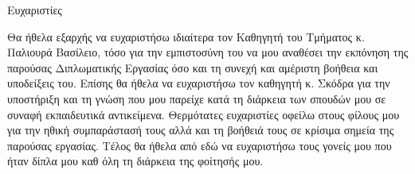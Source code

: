 \begin{center}
{\LARGE Ευχαριστίες}\\[1cm]
\end{center}

\noindent Θα ήθελα εξαρχής να ευχαριστήσω ιδιαίτερα τον Καθηγητή του Τμήματος κ. Παλιουρά Βασίλειο, τόσο για την εμπιστοσύνη του να μου αναθέσει την εκπόνηση της παρούσας Διπλωματικής Εργασίας όσο και τη συνεχή και αμέριστη βοήθεια και υποδείξεις του. Επίσης θα ήθελα να ευχαριστήσω τον καθηγητή κ. Σκόδρα για την υποστήριξη και τη γνώση που μου παρείχε κατά τη διάρκεια των σπουδών μου σε συναφή εκπαιδευτικά αντικείμενα. Θερμότατες ευχαριστίες οφείλω στους φίλους μου για την ηθική συμπαράστασή τους αλλά και τη βοήθειά τους σε κρίσιμα σημεία της παρούσας εργασίας. Τέλος θα ήθελα από εδώ να ευχαριστήσω τους γονείς μου που ήταν δίπλα μου καθ όλη τη διάρκεια της φοίτησής μου.


